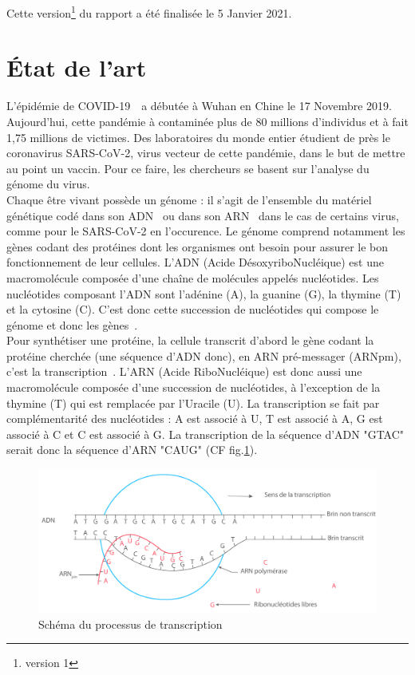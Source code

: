 \documentclass[12pt]{article}
\begin{document}
Cette version\footnote{version 1} du rapport a été finalisée le 5 Janvier 2021.

\newpage


\section{État de l'art}
L'épidémie de COVID-19~\cite{pandemie}~a débutée à Wuhan en Chine le 17 Novembre 2019. Aujourd'hui, cette pandémie à contaminée plus de 80 millions d'individus et à fait 1,75 millions de victimes. Des laboratoires du monde entier étudient de près le coronavirus SARS-CoV-2, virus vecteur de cette pandémie, dans le but de mettre au point un vaccin. Pour ce faire, les chercheurs se basent sur l'analyse du génome du virus.\\

Chaque être vivant possède un génome : il s'agit de l'ensemble du matériel génétique codé dans son ADN~\cite{adn} ou dans son ARN~\cite{arn} dans le cas de certains virus, comme pour le SARS-CoV-2 en l'occurence. Le génome comprend notamment les gènes codant des protéines dont les organismes ont besoin pour assurer le bon fonctionnement de leur cellules. L'ADN (Acide DésoxyriboNucléique) est une macromolécule composée d'une chaîne de molécules appelés nucléotides. Les nucléotides composant l'ADN sont l'adénine (A), la guanine (G), la thymine (T) et la cytosine (C). C'est donc cette succession de nucléotides qui compose le génome et donc les gènes~\cite{rnaw}.\\
Pour synthétiser une protéine, la cellule transcrit d'abord le gène codant la protéine cherchée (une séquence d'ADN donc), en ARN pré-messager (ARNpm), c'est la transcription~\cite{rnatrc}. L'ARN (Acide RiboNucléique) est donc aussi une macromolécule composée d'une succession de nucléotides, à l'exception de la thymine (T) qui est remplacée par l'Uracile (U). La transcription se fait par complémentarité des nucléotides : A est associé à U, T est associé à A, G est associé à C et C est associé à G. La transcription de la séquence d'ADN "GTAC" serait donc la séquence d'ARN "CAUG" (CF fig.\ref{fig:schema_transcription}).\\

\begin{figure}[!h]
    \centering
    \includegraphics[scale = 0.37]{Images/Intro/transc.png}
    \caption{Schéma du processus de transcription}
    \label{fig:schema_transcription}
\end{figure}
\end{document}
